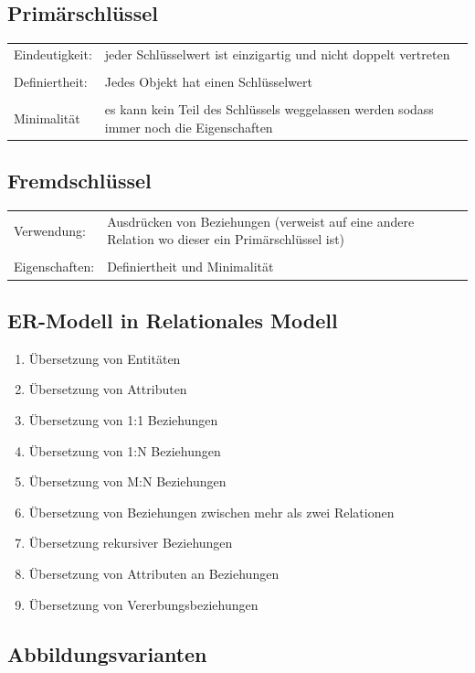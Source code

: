 \documentclass[a4paper]{article}
\begin{document}
\subsection{Primärschlüssel}
\begin{tabular}{l p{10cm}}
    Eindeutigkeit: &  jeder Schlüsselwert ist einzigartig und nicht doppelt vertreten \\
    & \\
    Definiertheit: & Jedes Objekt hat einen Schlüsselwert \\
    & \\
    Minimalität & es kann kein Teil des Schlüssels weggelassen werden sodass immer noch die Eigenschaften \\
\end{tabular}

\subsection{Fremdschlüssel}
\begin{tabular}{l p{10cm}}
    Verwendung: &  Ausdrücken von Beziehungen (verweist auf eine andere Relation wo dieser ein Primärschlüssel ist) \\
    & \\
    Eigenschaften: & Definiertheit und Minimalität
\end{tabular}

\subsection{ER-Modell in Relationales Modell}
\begin{enumerate}
    \item Übersetzung von Entitäten
    \item Übersetzung von Attributen
    \item Übersetzung von 1:1 Beziehungen
    \item Übersetzung von 1:N Beziehungen
    \item Übersetzung von M:N Beziehungen
    \item Übersetzung von Beziehungen zwischen mehr als zwei Relationen
    \item Übersetzung rekursiver Beziehungen
    \item Übersetzung von Attributen an Beziehungen
    \item Übersetzung von Vererbungsbeziehungen
\end{enumerate}

\subsection{Abbildungsvarianten}
\end{document}
